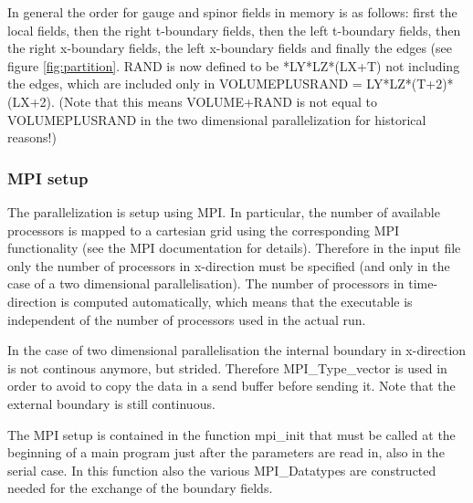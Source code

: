 In general the order for gauge and spinor fields in memory is as
follows: first the local fields, then the right t-boundary fields, then
the left t-boundary fields, then the right x-boundary fields, the left
x-boundary fields and finally the edges (see figure
\ref{fig:partition}. {\ttfamily RAND} is now defined to be {*LY*LZ*(LX+T)} not including the edges, which are included only in
{\ttfamily VOLUMEPLUSRAND = LY*LZ*(T+2)*(LX+2)}. (Note that this means
{\ttfamily VOLUME+RAND} is not equal to {\ttfamily VOLUMEPLUSRAND} in
the two dimensional parallelization for historical reasons!)

\subsubsection{MPI setup}

The parallelization is setup using MPI. In particular, the number of
available processors is mapped to a cartesian grid using the
corresponding MPI functionality (see the MPI documentation for
details). Therefore in the input file only the number of processors in
x-direction must be specified (and only in the case of a two
dimensional parallelisation). The number of processors in
time-direction is computed automatically, which means that the
executable is independent of the number of processors used in the
actual run.

In the case of two dimensional parallelisation the internal boundary
in x-direction is not continous anymore, but strided. Therefore
{\ttfamily MPI\_Type\_vector} is used in order to avoid to copy the data
in a send buffer before sending it. Note that the external boundary is
still continuous.

The MPI setup is contained in the function {\ttfamily mpi\_init} that
must be called at the beginning of a main program just after the
parameters are read in, also in the serial case. In this function also
the various {\ttfamily MPI\_Datatype}s are constructed needed for the
exchange of the boundary fields.

